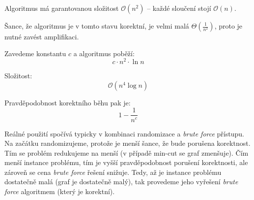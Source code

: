 \begin{compactitem}
    \item Algoritmus má garantovanou složitost $\mathcal{O}(n^2)$ -- každé sloučení stojí $\mathcal{O}(n)$.

    \item Šance, že algoritmus je v tomto stavu korektní, je velmi malá $\Theta(\frac{1}{n^2})$, proto je nutné zavést amplifikaci. \begin{compactitem}
        \item Zavedeme konstantu $c$ a algoritmus poběží:
        $$c \cdot n^2 \cdot \ln{n}$$
        \item Složitost:
        $$\mathcal{O}(n^4 \log{n})$$
        \item Pravděpodobnost korektního běhu pak je:
        $$1 - \frac{1}{n^c}$$
    \end{compactitem}

    \item Reálné použití spočívá typicky v kombinaci randomizace a \textit{brute force} přístupu. Na začátku randomizujeme, protože je menší šance, že bude porušena korektnost. Tím se problém redukujeme na menší (v případě min-cut se graf zmenšuje). Čím menší instance problému, tím je vyšší pravděpodobnost porušení korektnosti, ale zároveň se cena \textit{brute force} řešení snižuje. Tedy, až je instance problému dostatečně malá (graf je dostatečně malý), tak provedeme jeho vyřešení \textit{brute force} algoritmem (který je korektní).
\end{compactitem}
